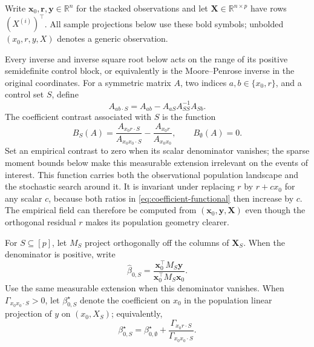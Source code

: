 \documentclass[a4paper,11pt,english]{article}
\newcommand{\R}{\mathbb R}
\begin{document}
Write $\mathbf x_0,\mathbf r,\mathbf y\in\R^n$ for the stacked observations
and let $\mathbf X\in\R^{n\times p}$ have rows $(X^{(i)})^\top$.
All sample projections below use these bold symbols; unbolded
$(x_0,r,y,X)$ denotes a generic observation.

Every inverse and inverse square root below acts on the range of its
positive semidefinite control block, or equivalently is the
Moore--Penrose inverse in the original coordinates.  For a symmetric
matrix $A$, two indices $a,b\in\{x_0,r\}$, and a control set $S$, define
\begin{equation}\label{eq:residual-moment}
        A_{ab\mathbin{\cdot}S}
        =A_{ab}-A_{aS}A_{SS}^{-1}A_{Sb}.
\end{equation}
The coefficient contrast associated with $S$ is the function
\begin{equation}\label{eq:coefficient-functional}
        B_S(A)
        =\frac{A_{x_0r\mathbin{\cdot}S}}{A_{x_0x_0\mathbin{\cdot}S}}
        -\frac{A_{x_0r}}{A_{x_0x_0}},
        \qquad B_\emptyset(A)=0.
\end{equation}
Set an empirical contrast to zero when its scalar denominator vanishes;
the sparse moment bounds below make this measurable extension irrelevant
on the events of interest.
This function carries both the observational population landscape and the
stochastic search around it.  It is invariant under replacing $r$ by
$r+c x_0$ for any scalar $c$, because both ratios in
\eqref{eq:coefficient-functional} then increase by $c$.  The empirical
field can therefore be computed from $(\mathbf x_0,\mathbf y,\mathbf X)$ even though the orthogonal
residual $r$ makes its population geometry clearer.

For $S\subseteq[p]$, let $M_S$ project orthogonally off the columns of
$\mathbf X_S$.  When the denominator is positive, write
\begin{equation*}
        \hat\beta_{0,S}
        =\frac{\mathbf x_0^\top M_S\mathbf y}
        {\mathbf x_0^\top M_S\mathbf x_0}.
\end{equation*}
Use the same measurable extension when this denominator vanishes.
When $\Gamma_{x_0x_0\mathbin{\cdot}S}>0$, let $\beta_{0,S}^\star$ denote the
coefficient on $x_0$ in the population linear projection of $y$ on
$(x_0,X_S)$; equivalently,
\begin{equation*}
        \beta_{0,S}^\star
        =\beta_{0,\emptyset}^\star
        +\frac{\Gamma_{x_0r\mathbin{\cdot}S}}
        {\Gamma_{x_0x_0\mathbin{\cdot}S}}.
\end{equation*}
\end{document}
